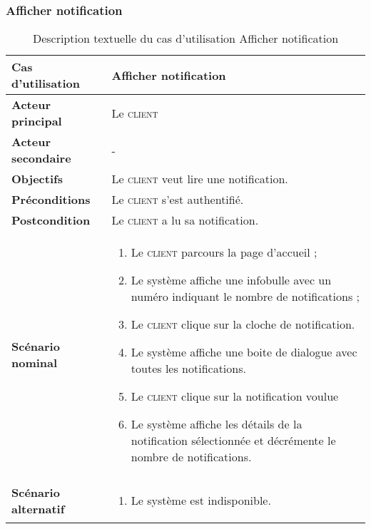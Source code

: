         \subsubsection[Afficher notification]{Afficher notification}
        \begin{longtable}{p{4cm} p{9cm}}
            \caption{Description textuelle du cas d’utilisation Afficher notification}
            \label{table:usecaseAfficherNotification}
            \\\hline\hline
                \textbf{Cas d’utilisation} & \textbf{Afficher notification}
            \\\hline\hline
                    \textbf{Acteur principal} & Le \textsc{client}
                \\
                    \textbf{Acteur secondaire} & -
                \\
                    \textbf{Objectifs} & Le \textsc{client} veut lire une
                    notification.
                \\
                    \textbf{Préconditions} & Le \textsc{client} s’est authentifié.
                \\
                    \textbf{Postcondition} & Le \textsc{client} a lu sa notification.
                \\
                \textbf{Scénario nominal} &
                    \begin{enumerate}[leftmargin=*]
                        \item Le \textsc{client} parcours la page d’accueil ;
                        \item Le système affiche une infobulle avec un numéro indiquant le nombre de
                        notifications ;
                        \item Le \textsc{client} clique sur la cloche de notification.
                        \item Le système affiche une boite de dialogue avec toutes les notifications.
                        \item Le \textsc{client} clique sur la notification voulue
                        \item Le système affiche les détails de la notification sélectionnée et décrémente le
                        nombre de notifications.
                    \end{enumerate}
                \\
                \textbf{Scénario alternatif} &
                    \begin{enumerate}[leftmargin=*]
                        \item Le système est indisponible.
                    \end{enumerate}
            \\\bottomrule
        \end{longtable}

